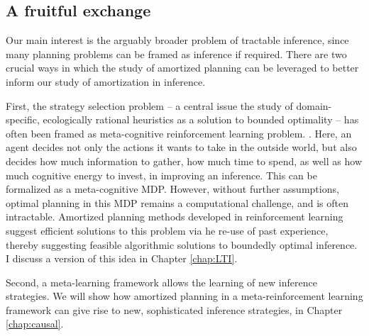 
\subsection{A fruitful exchange}

Our main interest is the arguably broader problem of tractable inference, since many planning problems can be framed as inference if required. There are two crucial ways in which the study of amortized planning can be leveraged to better inform our study of amortization in inference.

First, the strategy selection problem -- a central issue the study of domain-specific, ecologically rational heuristics as a solution to bounded optimality -- has often been framed as meta-cognitive reinforcement learning problem. \cite{erev2005adaptation, rieskamp2006ssl, lieder2017strategy}. Here, an agent decides not only the actions it wants to take in the outside world, but also decides how much information to gather, how much time to spend, as well as how much cognitive energy to invest, in improving an inference. This can be formalized as a meta-cognitive MDP. However, without further assumptions, optimal planning in this MDP remains a computational challenge, and is often intractable. Amortized planning methods developed in reinforcement learning suggest efficient solutions to this problem via he re-use of past experience, thereby suggesting feasible algorithmic solutions to boundedly optimal inference. I discuss a version of this idea in Chapter \ref{chap:LTI}.

Second, a meta-learning framework allows the learning of new inference strategies. We will show how amortized planning in a meta-reinforcement learning framework can give rise to new, sophisticated inference strategies, in Chapter \ref{chap:causal}.